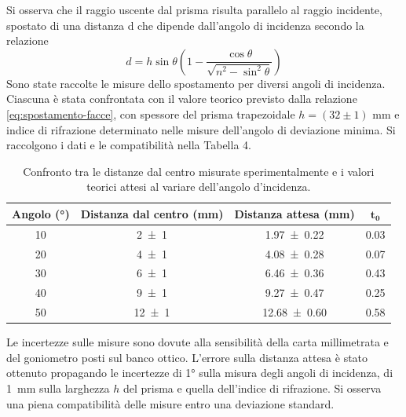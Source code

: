 Si osserva che il raggio uscente dal prisma risulta parallelo al raggio incidente, spostato di una distanza d che dipende dall'angolo di incidenza secondo la relazione
\begin{equation}
    \label{eq:spostamento-facce}
    d = h \sin\theta \left( 1 - \frac{\cos\theta}{\sqrt{n^2 - \operatorname\sin^2\theta}} \right)
\end{equation}
Sono state raccolte le misure dello spostamento per diversi angoli di incidenza. Ciascuna è stata confrontata con il valore teorico previsto dalla relazione \eqref{eq:spostamento-facce}, con spessore del prisma trapezoidale $h=(32\pm1)$ mm e indice di rifrazione determinato nelle misure dell'angolo di deviazione minima.
Si raccolgono i dati e le compatibilità nella Tabella 4.

\begin{table}[H]
\centering
\begin{tabular}{cccc}
\toprule
\textbf{Angolo \small{(\unit{\degree})}} & \textbf{Distanza dal centro \small{(\unit{mm})}} & \textbf{Distanza attesa \small{(\unit{mm})}} & $\mathbf{t_0}$ \\
\midrule
10 & \qty{2 \pm 1}{}  & \qty{1.97 \pm 0.22}{}  & 0.03 \\
20 & \qty{4 \pm 1}{}  & \qty{4.08 \pm 0.28}{}  & 0.07 \\
30 & \qty{6 \pm 1}{}  & \qty{6.46 \pm 0.36}{}  & 0.43 \\
40 & \qty{9 \pm 1}{}  & \qty{9.27 \pm 0.47}{}  & 0.25 \\
50 & \qty{12 \pm 1}{} & \qty{12.68 \pm 0.60}{} & 0.58 \\
\bottomrule
\end{tabular}
\caption{Confronto tra le distanze dal centro misurate sperimentalmente e i valori teorici attesi al variare dell'angolo d'incidenza.}
\label{tab:distanze_angoli}
\end{table}

Le incertezze sulle misure sono dovute alla sensibilità della carta millimetrata e del goniometro posti sul banco ottico. 
L'errore sulla distanza attesa è stato ottenuto propagando le incertezze di \ang{1} sulla misura degli angoli di incidenza, di \qty{1}{\milli\meter} sulla larghezza $h$ del prisma e quella dell'indice di rifrazione.
Si osserva una piena compatibilità delle misure entro una deviazione standard.




